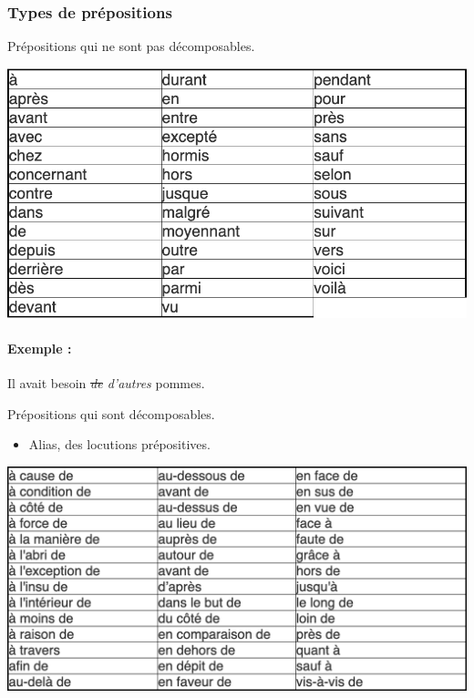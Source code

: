 \documentclass[10pt, french]{article}
\begin{document}
\begin{multicols*}{2}
\subsubsection*{Types de prépositions}
\begin{definitionNOHFILLsub}
Prépositions qui ne sont pas décomposables.
\begin{center}
	\includegraphics[width=0.9\columnwidth]{prep-simple}
\end{center}
\begin{astuces}
\paragraph{Exemple :}	Il avait besoin \textit{\sout{de} d'autres} pommes.
\end{astuces}
\end{definitionNOHFILLsub}

\begin{definitionNOHFILLsub}
Prépositions qui sont décomposables.
\begin{itemize}
	\item	Alias, des locutions prépositives.
\end{itemize}
\begin{center}
	\includegraphics[width=0.9\columnwidth]{prep-compl}
\end{center}
\end{definitionNOHFILLsub}


\end{multicols*}
\end{document}
